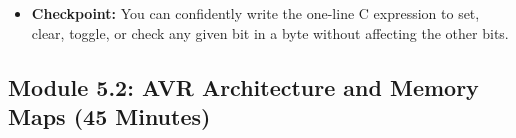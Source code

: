 \documentclass[11pt,a4paper]{article}
\begin{document}
\begin{itemize}
\begin{enumerate}[label=\arabic*.]
        \begin{itemize}
            \item \textbf{Scenario:} We want to make an LED blink without caring if it's currently on or off.
            \item \textbf{Code:} \verb|REG ^= (1 << 3);|
            \item \textbf{Math:} If bit 3 is 0, \verb|0 ^ 1 = 1|. If bit 3 is 1, \verb|1 ^ 1 = 0|. It flips automatically.
        \end{itemize}
\item \textbf{Checking a Bit (Bitwise AND} \verb|&|): Use this to read the state of a feature.
        \begin{itemize}
            \item \textbf{Scenario:} We want to know if a button connected to bit 3 is pressed.
            \item \textbf{Code:} \verb|if (REG & (1 << 3)) { ... }|
            \item \textbf{Math:} \verb|0b00011000 & 0b00001000| results in \verb|0b00001000|, which is non-zero (evaluates to \verb|true|). If bit 3 were 0, the result would be \verb|0b00000000| (evaluates to \verb|false|).
        \end{itemize}
    \end{enumerate}
    \item \textbf{Checkpoint:} You can confidently write the one-line C expression to set, clear, toggle, or check any given bit in a byte without affecting the other bits.
\end{itemize}
\newpage
\subsection*{Module 5.2: AVR Architecture and Memory Maps (45 Minutes)}
\end{document}
